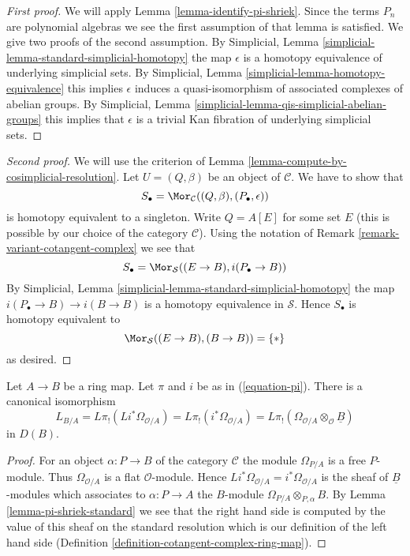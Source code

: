 \begin{proof}[First proof]
We will apply Lemma \ref{lemma-identify-pi-shriek}.
Since the terms $P_n$ are polynomial algebras we see the first
assumption of that lemma is satisfied. We give two proofs of the second
assumption. By
Simplicial, Lemma \ref{simplicial-lemma-standard-simplicial-homotopy}
the map $\epsilon$ is a homotopy equivalence of underlying
simplicial sets. By
Simplicial, Lemma \ref{simplicial-lemma-homotopy-equivalence}
this implies $\epsilon$ induces a quasi-isomorphism of associated
complexes of abelian groups. By
Simplicial, Lemma \ref{simplicial-lemma-qis-simplicial-abelian-groups}
this implies that $\epsilon$ is a trivial Kan fibration of underlying
simplicial sets.
\end{proof}

\begin{proof}[Second proof]
We will use the criterion of
Lemma \ref{lemma-compute-by-cosimplicial-resolution}.
Let $U = (Q, \beta)$ be an object of $\mathcal{C}$.
We have to show that
$$
S_\bullet = \Mor_\mathcal{C}((Q, \beta), (P_\bullet, \epsilon))
$$
is homotopy equivalent to a singleton. Write $Q = A[E]$ for some set $E$
(this is possible by our choice of the category $\mathcal{C}$). Using the
notation of Remark \ref{remark-variant-cotangent-complex} we see that
$$
S_\bullet = \Mor_\mathcal{S}((E \to B), i(P_\bullet \to B))
$$
By Simplicial, Lemma \ref{simplicial-lemma-standard-simplicial-homotopy}
the map $i(P_\bullet \to B) \to i(B \to B)$ is a homotopy equivalence
in $\mathcal{S}$. Hence $S_\bullet$ is homotopy equivalent to
$$
\Mor_\mathcal{S}((E \to B), (B \to B)) = \{*\}
$$
as desired.
\end{proof}

\begin{lemma}
\label{lemma-compute-cotangent-complex}
Let $A \to B$ be a ring map.  Let $\pi$ and $i$ be as in (\ref{equation-pi}).
There is a canonical isomorphism
$$
L_{B/A} = L\pi_!(Li^*\Omega_{\mathcal{O}/A}) =
L\pi_!(i^*\Omega_{\mathcal{O}/A}) =
L\pi_!(\Omega_{\mathcal{O}/A} \otimes_\mathcal{O} \underline{B})
$$
in $D(B)$.
\end{lemma}

\begin{proof}
For an object $\alpha : P \to B$ of the category $\mathcal{C}$
the module $\Omega_{P/A}$ is a free $P$-module. Thus
$\Omega_{\mathcal{O}/A}$ is a flat $\mathcal{O}$-module. Hence
$Li^*\Omega_{\mathcal{O}/A} = i^*\Omega_{\mathcal{O}/A}$ is the sheaf
of $\underline{B}$-modules which associates to $\alpha : P \to A$ the
$B$-module $\Omega_{P/A} \otimes_{P, \alpha} B$.
By Lemma \ref{lemma-pi-shriek-standard}
we see that the right hand side is computed by
the value of this sheaf on the standard resolution which is our
definition of the left hand side
(Definition \ref{definition-cotangent-complex-ring-map}).
\end{proof}

